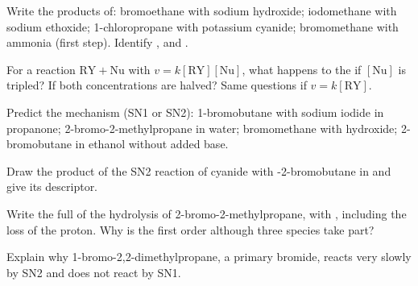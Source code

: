 \begin{exercise}[$\star$]\label{exo:b1:nucleophilic-substitution:1}
Write the products of: bromoethane with sodium hydroxide; iodomethane with
sodium ethoxide; 1-chloropropane with potassium cyanide; bromomethane with
ammonia (first step). Identify ,  and .
\end{exercise}

\begin{exercise}[$\star$]\label{exo:b1:nucleophilic-substitution:2}
For a reaction $\mathrm{RY} + \mathrm{Nu}$ with $v = k[\mathrm{RY}][\mathrm{Nu}]$,
what happens to the  if $[\mathrm{Nu}]$ is tripled? If both
concentrations are halved? Same questions if $v = k[\mathrm{RY}]$.
\end{exercise}

\begin{exercise}[$\star$]\label{exo:b1:nucleophilic-substitution:3}
Predict the mechanism (SN1 or SN2): 1-bromobutane with sodium iodide in
propanone; 2-bromo-2-methylpropane in water; bromomethane with hydroxide;
2-bromobutane in ethanol without added base.
\end{exercise}

\begin{exercise}[$\star$]\label{exo:b1:nucleophilic-substitution:4}
Draw the product of the SN2 reaction of cyanide with -2-bromobutane
in  and give its descriptor.
\end{exercise}

\begin{exercise}[$\star\star$]\label{exo:b1:nucleophilic-substitution:5}
Write the full  of the hydrolysis of 2-bromo-2-methylpropane,
with , including the loss of the proton. Why is the 
first order although three species take part?
\end{exercise}

\begin{exercise}[$\star\star$]\label{exo:b1:nucleophilic-substitution:6}
Explain why 1-bromo-2,2-dimethylpropane, a primary bromide, reacts very
slowly by SN2 and does not react by SN1.
\end{exercise}

